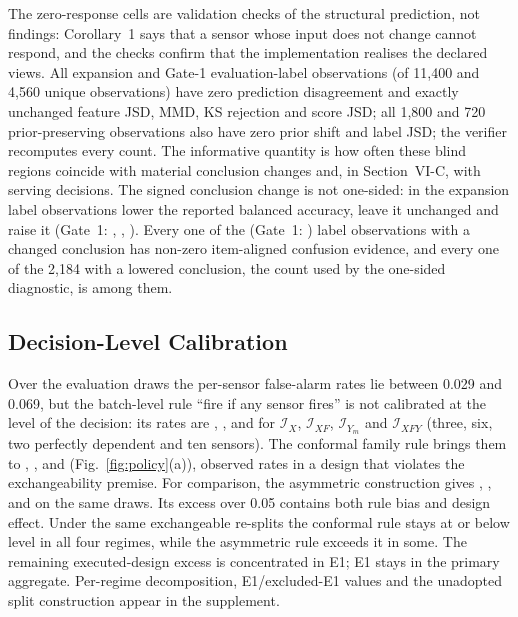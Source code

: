 \documentclass[10pt,journal,compsoc]{IEEEtran}
\newcommand{\IX}{\mathcal I_X}
\newcommand{\IXF}{\mathcal I_{XF}}
\newcommand{\IYm}{\mathcal I_{Y_m}}
\newcommand{\IXFY}{\mathcal I_{XFY}}
\begin{document}
The zero-response cells are validation checks of the structural prediction,
not findings: Corollary~1 says that a sensor whose input does not change
cannot respond, and the checks confirm that the implementation realises the
declared views. All \LabelRowsExp{} expansion and \LabelRowsGone{} Gate-1
evaluation-label observations (of 11,400 and 4,560 unique observations) have
zero prediction disagreement and exactly unchanged feature JSD, MMD, KS
rejection and score JSD; all 1,800 and 720 prior-preserving observations also
have zero prior shift and label JSD; the verifier recomputes every count. The
informative quantity is how often these blind regions coincide with material
conclusion changes and, in Section~VI-C, with serving decisions. The signed
conclusion change is not one-sided: in the expansion \LabelDecreasedExp{}
label observations lower the reported balanced accuracy, \LabelUnchangedExp{}
leave it unchanged and \LabelIncreasedExp{} raise it (Gate~1:
\LabelDecreasedGone{}, \LabelUnchangedGone{}, \LabelIncreasedGone{}). Every
one of the \LabelMaterialExp{} (Gate~1: \LabelMaterialGone{}) label
observations with a changed conclusion has non-zero item-aligned confusion
evidence, and every one of the 2,184 with a lowered conclusion, the count
used by the one-sided diagnostic, is among them.


\subsection{Decision-Level Calibration}

Over the \NEvalDraws{} evaluation draws the per-sensor false-alarm rates lie
between 0.029 and 0.069, but the batch-level rule ``fire if any sensor
fires'' is not calibrated at the level of the decision: its rates are
\FprUnionIX{}, \FprUnionIXF{}, \FprUnionIYm{} and \FprUnionIXFY{} for $\IX$,
$\IXF$, $\IYm$ and $\IXFY$ (three, six, two perfectly dependent and ten
sensors). The conformal family rule brings them to \FprFamilyIX{},
\FprFamilyIXF{}, \FprFamilyIYm{} and \FprFamilyIXFY{} (Fig.~\ref{fig:policy}(a)),
observed rates in a design that violates the exchangeability premise. For
comparison, the asymmetric construction gives \FprLegacyIX{}, \FprLegacyIXF{},
\FprLegacyIYm{} and \FprLegacyIXFY{} on the same draws. Its excess over 0.05
contains both rule bias and design effect. Under the same exchangeable
re-splits the conformal rule stays at or below level \ConformalLevel{} in all
four regimes, while the asymmetric rule exceeds it in some.
The remaining executed-design excess is concentrated in E1; E1 stays in the
primary aggregate. Per-regime decomposition, E1/excluded-E1 values and the
unadopted split construction appear in the supplement.
\end{document}
